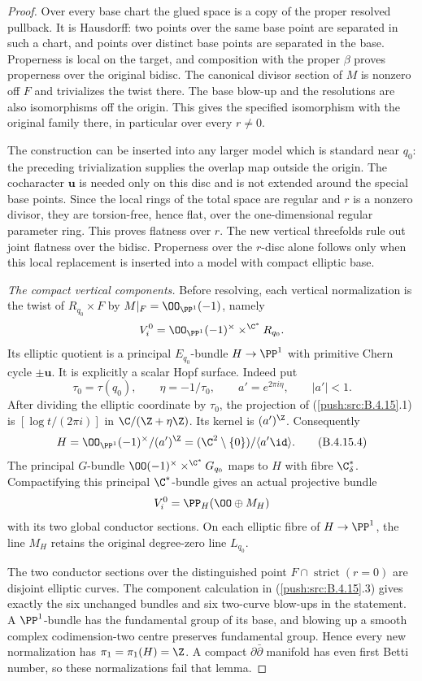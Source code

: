 \begin{proof}
Over every base chart the glued space is a copy of the
proper resolved pullback. It is Hausdorff: two points
over the same base point are separated in such a chart,
and points over distinct base points are separated in
the base. Properness is local on the target, and
composition with the proper $\beta$ proves properness
over the original bidisc. The canonical divisor section
of $M$ is nonzero off $F$ and trivializes the twist there.
The base blow-up and the resolutions are also
isomorphisms off the origin. This gives the specified
isomorphism with the original family there, in particular
over every $r\ne0$.

The construction can be inserted into any larger model
which is standard near $q_0$: the preceding
trivialization supplies the overlap map outside the
origin. The cocharacter $\mathbf u$ is needed only on
this disc and is not extended around the special base
points. Since the local rings of the total space are
regular and $r$ is a nonzero divisor, they are
torsion-free, hence flat, over the one-dimensional
regular parameter ring. This proves flatness over $r$.
The new vertical threefolds rule out joint flatness over
the bidisc. Properness over the $r$-disc alone follows
only when this local replacement is inserted into a
model with compact elliptic base.

\emph{The compact vertical components.}
Before resolving, each vertical normalization is the
twist of $R_{q_0}\times F$ by
$M|_F=\OO_{\PP^1}(-1)$, namely
\[
 V_i^0=\OO_{\PP^1}(-1)^\times
                    \mathbin{\times^{\C^*}}R_{q_0}.
\]
Its elliptic quotient is a principal $E_{q_0}$-bundle
$H\to\PP^1$ with primitive Chern cycle
$\pm\mathbf u$. It is explicitly a scalar Hopf surface.
Indeed put
\[
 \tau_0=\tau(q_0),\qquad
 \eta=-1/\tau_0,\qquad a'=e^{2\pi i\eta},
 \qquad |a'|<1.
\]
After dividing the elliptic coordinate by $\tau_0$,
the projection of (\ref{push:src:B.4.15}.1) is
$[\log t/(2\pi i)]$ in $\C/(\Z+\eta\Z)$.
Its kernel is $(a')^\Z$. Consequently
\[
 H=\OO_{\PP^1}(-1)^\times/(a')^\Z
   =(\C^2\setminus\{0\})/\langle a'\id\rangle.
 \tag{B.4.15.4}
\]
The principal $G$-bundle
$\OO(-1)^\times\mathbin{\times^{\C^*}}G_{q_0}$
maps to $H$ with fibre $\C^*_{\delta}$.
Compactifying this principal $\C^*$-bundle gives an
actual projective bundle
\[
 V_i^0=\PP_H(\OO\oplus M_H)
\]
with its two global conductor sections. On each
elliptic fibre of $H\to\PP^1$, the line $M_H$ retains
the original degree-zero line $L_{q_0}$.

The two conductor sections over the distinguished point
$F\cap\operatorname{strict}(r=0)$ are disjoint elliptic
curves. The component calculation in (\ref{push:src:B.4.15}.3) gives
exactly the six unchanged bundles and six two-curve
blow-ups in the statement. A $\PP^1$-bundle has the
fundamental group of its base, and blowing up a smooth
complex codimension-two centre preserves fundamental
group. Hence every new normalization has
$\pi_1=\pi_1(H)=\Z$. A compact
$\partial\bar\partial$ manifold has even first Betti
number, so these normalizations fail that lemma.


\end{proof}
